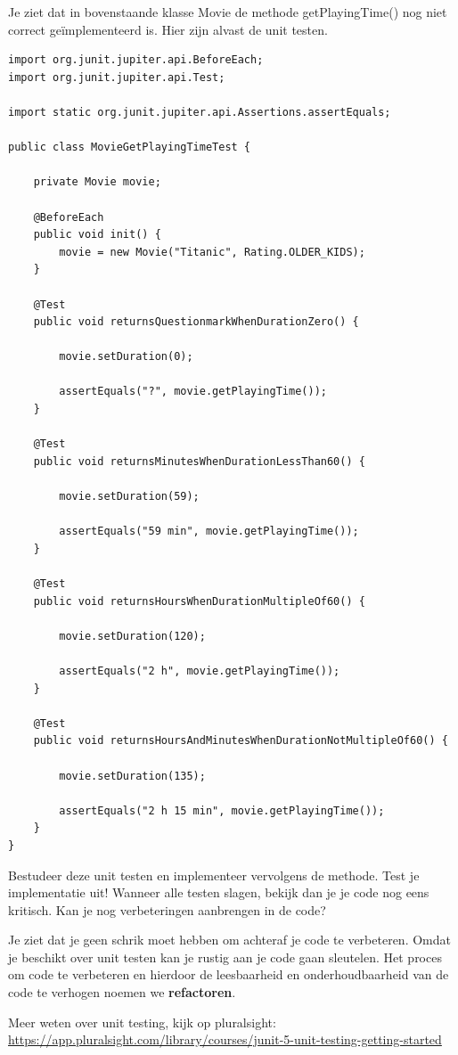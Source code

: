 \begin{oefening}
Je ziet dat in bovenstaande klasse Movie de methode getPlayingTime() nog niet correct ge\"implementeerd is. Hier zijn alvast de unit testen. 

\begin{lstlisting}
import org.junit.jupiter.api.BeforeEach;
import org.junit.jupiter.api.Test;

import static org.junit.jupiter.api.Assertions.assertEquals;

public class MovieGetPlayingTimeTest {

	private Movie movie;

	@BeforeEach
	public void init() {
		movie = new Movie("Titanic", Rating.OLDER_KIDS);
	}

	@Test
	public void returnsQuestionmarkWhenDurationZero() {

		movie.setDuration(0);

		assertEquals("?", movie.getPlayingTime());
	}

	@Test
	public void returnsMinutesWhenDurationLessThan60() {

		movie.setDuration(59);

		assertEquals("59 min", movie.getPlayingTime());
	}

	@Test
	public void returnsHoursWhenDurationMultipleOf60() {

		movie.setDuration(120);

		assertEquals("2 h", movie.getPlayingTime());
	}

	@Test
	public void returnsHoursAndMinutesWhenDurationNotMultipleOf60() {

		movie.setDuration(135);

		assertEquals("2 h 15 min", movie.getPlayingTime());
	}
}
\end{lstlisting}

Bestudeer deze unit testen en implementeer vervolgens de methode. Test je implementatie uit! Wanneer alle testen slagen, bekijk dan je je code nog eens kritisch. Kan je nog verbeteringen aanbrengen in de code?
\end{oefening}

Je ziet dat je geen schrik moet hebben om achteraf je code te verbeteren. Omdat je beschikt over unit testen kan je rustig aan je code gaan sleutelen. Het proces om code te verbeteren en hierdoor de leesbaarheid en onderhoudbaarheid van de code te verhogen noemen we \textbf{refactoren}. 

\begin{remark}
  Meer weten over unit testing, kijk op pluralsight: \url{https://app.pluralsight.com/library/courses/junit-5-unit-testing-getting-started}
\end{remark}

